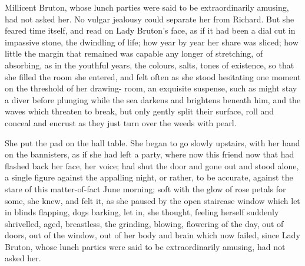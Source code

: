 \documentclass[lang=cn,10pt]{elegantbook}
\begin{document}
Millicent Bruton, whose lunch parties were said to be extraordinarily
amusing, had not asked her.  No vulgar jealousy could separate
her from Richard.  But she feared time itself, and read on Lady
Bruton's face, as if it had been a dial cut in impassive stone, the
dwindling of life; how year by year her share was sliced; how little
the margin that remained was capable any longer of stretching, of
absorbing, as in the youthful years, the colours, salts, tones of
existence, so that she filled the room she entered, and felt often
as she stood hesitating one moment on the threshold of her drawing-
room, an exquisite suspense, such as might stay a diver before
plunging while the sea darkens and brightens beneath him, and the
waves which threaten to break, but only gently split their surface,
roll and conceal and encrust as they just turn over the weeds with
pearl.

She put the pad on the hall table.  She began to go slowly
upstairs, with her hand on the bannisters, as if she had left a
party, where now this friend now that had flashed back her face,
her voice; had shut the door and gone out and stood alone, a single
figure against the appalling night, or rather, to be accurate,
against the stare of this matter-of-fact June morning; soft with
the glow of rose petals for some, she knew, and felt it, as she
paused by the open staircase window which let in blinds flapping,
dogs barking, let in, she thought, feeling herself suddenly
shrivelled, aged, breastless, the grinding, blowing, flowering of
the day, out of doors, out of the window, out of her body and brain
which now failed, since Lady Bruton, whose lunch parties were said
to be extraordinarily amusing, had not asked her.
\end{document}
